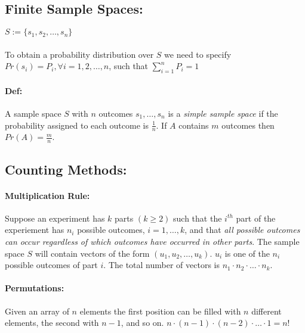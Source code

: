 \documentclass{article}
\begin{document}
\begin{multicols}{3}
    \subsection*{Finite Sample Spaces: } \(S := \{s_1, s_2, \dots, s_n \}\)
        \paragraph*{} To obtain a probability distribution over $S$ we need to specify \(Pr(s_i) = P_i, \forall i = 1, 2, \dots, n\), such that \(\sum\limits_{i=1}^{n}P_i = 1\)

        \paragraph*{Def: } A sample space $S$ with $n$ outcomes $s_1, \dots, s_n$ is a \textit{simple sample space} if the probability assigned to each outcome is $\frac{1}{n}$. If $A$ contains $m$ outcomes then \(Pr(A) = \frac{m}{n}\).

    \subsection*{Counting Methods: }
        \paragraph*{Multiplication Rule: } Suppose an experiment has $k$ parts \((k \geq 2)\) such that the $i^{th}$ part of the experiement has $n_i$ possible outcomes, $i = 1, \dots, k$, and that \textit{all possible outcomes can occur regardless of which outcomes have occurred in other parts}. The sample space $S$ will contain vectors of the form $(u_1, u_2, \dots, u_k)$. $u_i$ is one of the $n_i$ possible outcomes of part $i$. The total number of vectors is $n_1 \cdot n_2 \cdot \dots \cdot n_k$.
        \paragraph*{Permutations: } Given an array of $n$ elements the first position can be filled with $n$ different elements, the second with $n-1$, and so on. $n \cdot (n-1) \cdot (n-2) \cdot \dots \cdot 1 = n!$
        \end{multicols}
\end{document}
